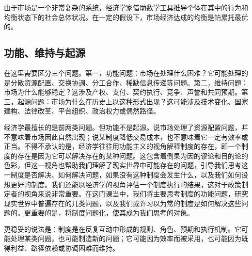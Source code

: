 \documentclass[UTF8,10pt,a4paper,scheme=chinese,fontset=none]{ctexart}
\begin{document}
由于市场是一个非常复杂的系统，经济学家借助数学工具推导个体在其中的行为和均衡状态下的社会总体状况。在一定的假设下，市场经济达成的均衡是帕累托最优的。
  


\subsection{功能、维持与起源}
在这里需要区分三个问题。第一，功能问题：市场在处理什么困难？它可能处理的是分散资源配置、交换协调、分工合作、稀缺信息传递等问题。第二，维持问题：市场为什么能够稳定？这涉及产权、支付、契约执行、竞争、声誉和共同预期。第三，起源问题：市场为什么在历史上以这种形式出现？这可能涉及技术变化、国家建构、法律改革、平台组织、政治权力或偶然路径。

经济学最擅长的是前两类问题。但功能不是起源。说市场处理了资源配置问题，并不意味着市场因此自然出现；说某制度降低交易成本，也不意味着它一定有效率或正当。不得不承认的是，经济学往往用功能主义的视角解释制度的存在，即一个制度的存在是因为它可以解决存在的某种问题。这包含着倒果为因的谬论和目的论的色彩，但这一视角也帮助我们理解了现实世界中可能存在的问题，引导我们思考这一制度是否解决、如何解决问题，如果没有这种制度会发生什么，以及我们如何设想更好的制度。我们还能以经济学的视角评估一个制度执行的结果，这对于政策制定者的视角来说非常重要。在这门课当中，我们将主要思考制度的功能问题，研究现实世界中普遍存在的几类问题，以及我们或许习以为常的制度是如何解决这些问题的。更重要的是，将制度问题化，使其成为我们思考的对象。

更稳妥的说法是：制度是在反复互动中形成的规则、角色、预期和执行机制。它可能处理某类问题，也可能制造新的问题；它可能因为效率而被采用，也可能因为既得利益、路径依赖或协调困难而维持。


\end{document}
